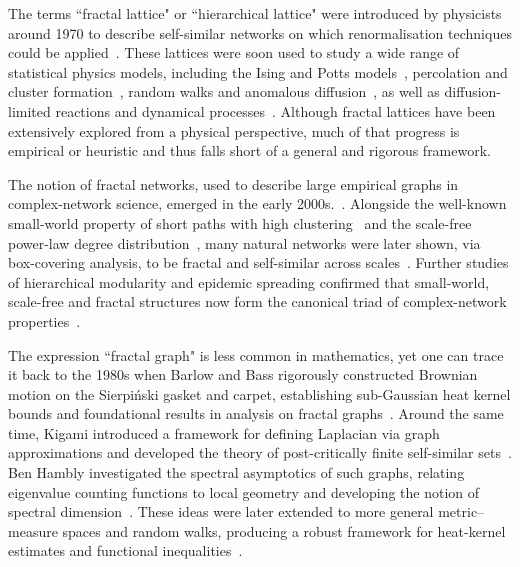 \documentclass[12pt]{iopart}
\begin{document}
The terms ``fractal lattice" or ``hierarchical lattice" were introduced by physicists around 1970 to describe self-similar networks 
on which renormalisation techniques could be applied~\cite{migdal1996recursion,kadanoff1976notes}.
These lattices were soon used to study a wide range of statistical physics models, 
including the Ising and Potts models~\cite{stanley1977cluster,berker1979renormalisation,kaufman1981exactly}, 
percolation and cluster formation~\cite{alexander1982density,gefen1984phase}, 
random walks and anomalous diffusion~\cite{toussaint1983particle,stanley1984flow}, 
as well as diffusion-limited reactions and dynamical processes~\cite{toussaint1983particle,derrida1983fractal}.
Although fractal lattices have been extensively explored from a physical perspective, 
much of that progress is empirical or heuristic and thus falls short of a general and rigorous framework.

The notion of fractal networks, used to describe large empirical graphs in complex-network science, emerged in the early 2000s.~\cite{song2005self}.
Alongside the well-known small-world property of short paths with high clustering~\cite{watts1998collective} 
and the scale-free power-law degree distribution~\cite{barabasi1999emergence}, 
many natural networks were later shown, via box-covering analysis, to be fractal and self-similar across scales~\cite{song2005self}.
Further studies of hierarchical modularity and epidemic spreading confirmed that 
small-world, scale-free and fractal structures now form the canonical triad of 
complex-network properties~\cite{ravasz2003hierarchical,pastor2001epidemic}.

The expression ``fractal graph" is less common in mathematics, 
yet one can trace it back to the 1980s 
when Barlow and Bass rigorously constructed Brownian motion on the Sierpiński gasket and carpet, 
establishing sub-Gaussian heat kernel bounds and foundational results in analysis 
on fractal graphs~\cite{barlow1988brownian,barlow1997transition,barlow1999brownian}.
Around the same time, 
Kigami introduced a framework for defining Laplacian via graph approximations 
and developed the theory of 
post-critically finite self-similar sets~\cite{kigami1989harmonic,kigami1993harmonic,kigami2001analysis}.
Ben Hambly investigated the spectral asymptotics of such graphs, 
relating eigenvalue counting functions to local geometry 
and developing the notion of spectral dimension~\cite{hambly2010diffusion,hambly2011asymptotics}.
These ideas were later extended to more general metric–measure spaces and random walks, 
producing a robust framework for heat-kernel estimates and 
functional inequalities~\cite{grigor2008dichotomy,grigor2003heat,li2021self,devyver2023gradient}.
\end{document}
